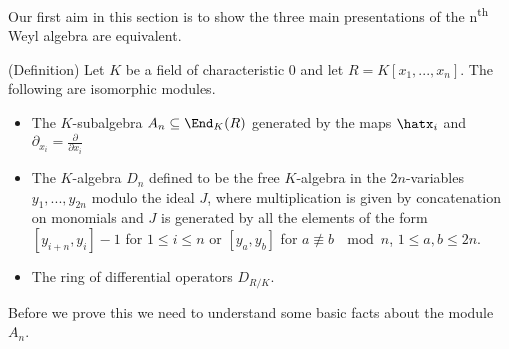 Our first aim in this section is to show the three main presentations of the n\textsuperscript{th} Weyl algebra are equivalent.

\begin{thm}(Definition)\label{thm:Weyl-algebra-defs}
	Let $K$ be a field of characteristic $0$ and let $R = K[x_1,...,x_n]$. The following are isomorphic modules.
	\begin{itemize}
		\item The $K$-subalgebra $A_n \subseteq \End_K(R)$ generated by the maps $\hatx_i$ and $\partial_{x_i} = \frac{\partial}{\partial x_i}$
		\item The $K$-algebra $D_n$ defined to be the free $K$-algebra in the $2n$-variables $y_1,...,y_{2n}$ modulo the ideal $J$, where multiplication is given by concatenation on monomials and $J$ is generated by all the elements of the form $[y_{i+n},y_{i}] - 1$ for $1\leq i\leq n$ or $[y_a,y_b]$ for $a \not\equiv b ~ \mod n$, $1\leq a,b\leq 2n$.
		\item The ring of differential operators $D_{R/K}$.
	\end{itemize}
\end{thm}

\noindent Before we prove this we need to understand some basic facts about the module $A_n$.

